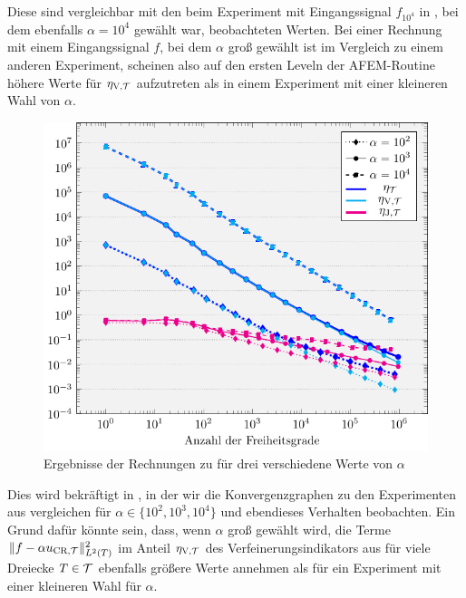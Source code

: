 Diese sind vergleichbar mit den beim Experiment mit Eingangssignal $f_{10^4}$
in , bei dem ebenfalls $\alpha=10^4$ gewählt
war, beobachteten Werten. 
Bei einer Rechnung mit einem Eingangssignal $f$, bei dem $\alpha$ groß gewählt
ist im Vergleich zu einem anderen Experiment, scheinen also auf den ersten
Leveln der AFEM-Routine höhere Werte für $\eta_{\textup{V}, \mathcal{T}}$ aufzutreten als in einem
Experiment mit einer kleineren Wahl von $\alpha$.
\begin{figure}[p]
  \centering
  \includegraphics[width=.8\linewidth]
    {pictures/chapExperiments/secGrayscale/denoise/conv.pdf}
  \caption{Ergebnisse der Rechnungen zu  für drei
    verschiedene Werte von $\alpha$}
  \label{fig:denoiseConvergence}
\end{figure}
Dies wird bekräftigt in , in der wir die
Konvergenzgraphen zu den Experimenten aus 
vergleichen für $\alpha\in\{10^2,10^3,10^4\}$ und ebendieses Verhalten
beobachten.
Ein Grund dafür könnte sein, dass, wenn $\alpha$ groß gewählt wird, die Terme
$\Vert f-\alpha u_{\textup{CR}, \mathcal{T}}\Vert^2_{L^2(T)}$ im Anteil $\eta_{\textup{V}, \mathcal{T}}$ des
Verfeinerungsindikators aus  für viele Dreiecke
$T\in\mathcal{T}$ ebenfalls größere Werte annehmen als für ein Experiment mit einer
kleineren Wahl für $\alpha$.
